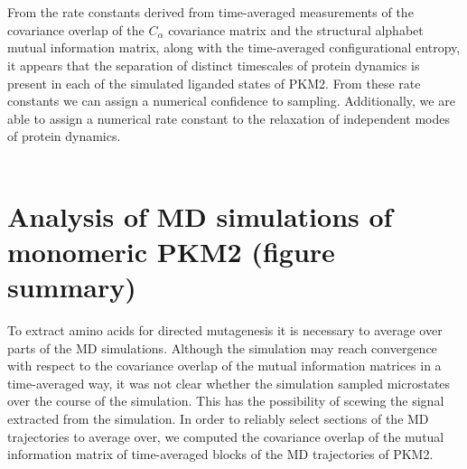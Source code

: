 \documentclass[11pt]{article}
\begin{document}
\\
\\
From the rate constants derived from time-averaged measurements of the covariance overlap of the $C_\alpha$ covariance matrix and the structural alphabet mutual information matrix, along with the time-averaged configurational entropy, it appears that the separation of distinct timescales of protein dynamics is present in each of the simulated liganded states of PKM2. From these rate constants we can assign a numerical confidence to sampling. Additionally, we are able to assign a numerical rate constant to the relaxation of independent modes of protein dynamics.
\\
\\
\section*{Analysis of MD simulations of monomeric PKM2 (figure summary)} 
To extract amino acids for directed mutagenesis it is necessary to average over parts of the MD simulations. Although the simulation may reach convergence with respect to the covariance overlap of the mutual information matrices in a time-averaged way, it was not clear whether the simulation sampled microstates over the course of the simulation. This has the possibility of scewing the signal extracted from the simulation. In order to reliably select sections of the MD trajectories to average over, we computed the covariance overlap of the mutual information matrix of time-averaged blocks of the MD trajectories of PKM2.   
\newpage
\end{document}

